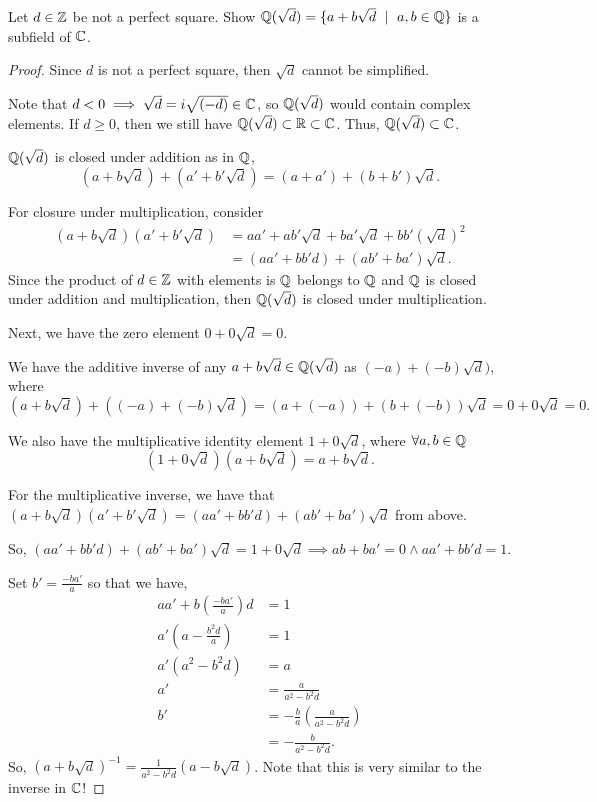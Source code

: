 \documentclass[../hw3]{subfiles}
\begin{document}
\begin{problem}
Let $d\in \mathbb{Z}$ be not a perfect square.
Show $\mathbb{Q}(\sqrt{d} ) = \{ a + b\sqrt{d}\ \mid\ a,b \in \mathbb{Q} \} $ is a subfield of $\mathbb{C}$.
\end{problem}
\begin{proof}
	Since $d$ is not a perfect square, then  $\sqrt{d}$ cannot be simplified.

	Note that $d<0 \implies \sqrt{d} = i\sqrt{(-d)} \in \mathbb{C}$, so $\mathbb{Q}(\sqrt{d})$ would contain complex elements.
	If $d\ge 0$, then we still have $\mathbb{Q}(\sqrt{d})\subset \mathbb{R}\subset \mathbb{C}$.
	Thus, $\mathbb{Q}(\sqrt{d})\subset \mathbb{C}$.

	$\mathbb{Q}(\sqrt{d})$ is closed under addition as in $\mathbb{Q}$, \[
		(a+b\sqrt{d})+(a'+b'\sqrt{d})=(a+a')+(b+b')\sqrt{d}
		.\]

	For closure under multiplication, consider
	\begin{align*}
		(a+b\sqrt{d})(a'+b'\sqrt{d}) & = aa'+ab'\sqrt{d}+ba'\sqrt{d}+bb'(\sqrt{d})^2 \\
		                             & = (aa'+bb'd)+(ab'+ba')\sqrt{d}
		.\end{align*}
	Since the product of $d\in \mathbb{Z}$ with elements is $\mathbb{Q}$ belongs to $\mathbb{Q}$ and $\mathbb{Q}$ is closed under addition and multiplication,
	then $\mathbb{Q}(\sqrt{d})$ is closed under multiplication.

	Next, we have the zero element $0+0\sqrt{d}=0$.

	We have the additive inverse of any $a+b\sqrt{d}\in \mathbb{Q}(\sqrt{d})$ as $(-a)+(-b)\sqrt{d})$, where \[
		(a+b\sqrt{d})+((-a)+(-b)\sqrt{d}) = (a+(-a)) + (b+(-b))\sqrt{d} = 0+0\sqrt{d} = 0
		.\]

	We also have the multiplicative identity element $1+0\sqrt{d}$, where $\forall a,b\in \mathbb{Q}$ \[
		(1+0\sqrt{d})(a+b\sqrt{d})=a+b\sqrt{d}
		.\]

	For the multiplicative inverse, we have that $(a+b\sqrt{d})(a'+b'\sqrt{d})=(aa'+bb'd)+(ab'+ba')\sqrt{d}$ from above.

	So, $(aa'+bb'd)+(ab'+ba')\sqrt{d}=1+0\sqrt{d}\implies ab+ba' = 0 \land aa'+bb'd=1$.

	Set $b'=\frac{-ba'}{a}$ so that we have,
	\begin{align*}
		aa'+b \left( \frac{-ba'}{a}\right) d & = 1                                            \\
		a' \left(a- \frac{b^2 d}{a} \right)  & = 1                                            \\
		a'(a^2-b^2 d )                       & = a                                            \\
		a'                                   & = \frac{a}{a^2-b^2 d}                          \\
		b'                                   & = -\frac{b}{a}\left(\frac{a}{a^2-b^2 d}\right) \\
		                                     & = -\frac{b}{a^2-b^2 d}
		.\end{align*}
	So, ${(a+b\sqrt{d} )}^{-1} = \frac{1}{a^2-b^2 d}(a-b\sqrt{d} )$.
	Note that this is very similar to the inverse in $\mathbb{C}$!


\end{proof}
\end{document}
